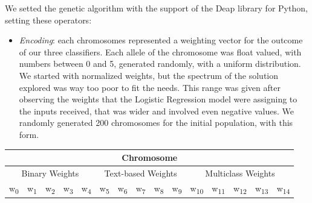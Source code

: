 We setted the genetic algorithm with the support of the Deap library for Python, setting these operators:
\begin{itemize}
	\item[\PencilRight]\textit{Encoding}: each chromosomes represented a weighting vector for the outcome of our three classifiers. Each allele of the chromosome was float valued, with numbers between 0 and 5, generated randomly, with a uniform distribution. We started with normalized weights, but the spectrum of the solution explored was way too poor to fit the needs.
	This range was given after observing the weights that the Logistic Regression model were assigning to the inputs received, that was wider and involved even negative values.
	We randomly generated 200 chromosomes for the initial population, with this form.
\end{itemize}
	\begin{center}
		\begin{tabular}{@{}c|c|c|c|c|c|c|c|c|c|c|c|c|c|c@{}}
			\multicolumn{15}{c}{Chromosome} \\
			\hline
			\multicolumn{5}{c|}{Binary Weights} & 
			\multicolumn{5}{c|}{Text-based Weights} & 
			\multicolumn{5}{c}{Multiclass Weights}\\
			\hline
			w\textsubscript{0} &
			w\textsubscript{1} &
			w\textsubscript{2} &
			w\textsubscript{3} &
			w\textsubscript{4} &
			w\textsubscript{5} &
			w\textsubscript{6} &
			w\textsubscript{7} &
			w\textsubscript{8} &
			w\textsubscript{9} &
			w\textsubscript{10} &
			w\textsubscript{11} &
			w\textsubscript{12} &
			w\textsubscript{13} &
			w\textsubscript{14}\\
			\hline
		\end{tabular}\\
	\end{center}
